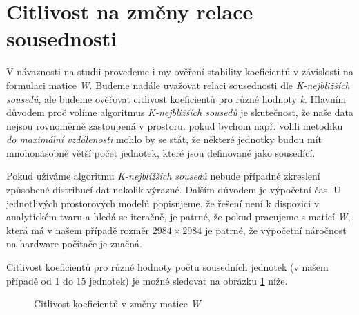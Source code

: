 \documentclass[11pt, a4paper]{article}
\begin{document}
\section{Citlivost na změny relace sousednosti}

V návaznosti na studii \cite{formanek2016stability} provedeme i my ověření stability koeficientů v závislosti na formulaci matice \textit{W}. Budeme nadále uvažovat relaci sousednosti dle \textit{K-nejbližších sousedů}, ale budeme ověřovat citlivost koeficientů pro různé hodnoty \textit{k}. Hlavním důvodem proč volíme algoritmus \textit{K-nejbližších sousedů} je skutečnost, že naše data nejsou rovnoměrně zastoupená v prostoru. pokud bychom např. volili metodiku \textit{do maximální vzdálenosti} mohlo by se stát, že některé jednotky budou mít mnohonásobně větší počet jednotek, které jsou definované jako sousedící. 

Pokud užíváme algoritmu \textit{K-nejbližších sousedů} nebude případné zkreslení způsobené distribucí dat nakolik výrazné. Dalším důvodem je výpočetní čas. U jednotlivých prostorových modelů popisujeme, že řešení není k dispozici v analytickém tvaru a hledá se iteračně, je patrné, že pokud pracujeme s maticí \textit{W}, která má v našem případě rozměr \textit{$2984 \times 2984$} je patrné, že výpočetní náročnost na hardware počítače je značná.

Citlivost koeficientů pro různé hodnoty počtu sousedních jednotek (v našem případě od 1 do 15 jednotek) je možné sledovat na obrázku \ref{Citlivost koeficientů v změny matice} níže.

\begin{figure}[ht]
\centering
\noindent{}
\caption{Citlivost koeficientů v změny matice \textit{W}}
\label{Citlivost koeficientů v změny matice}
\end{figure}
\end{document}
